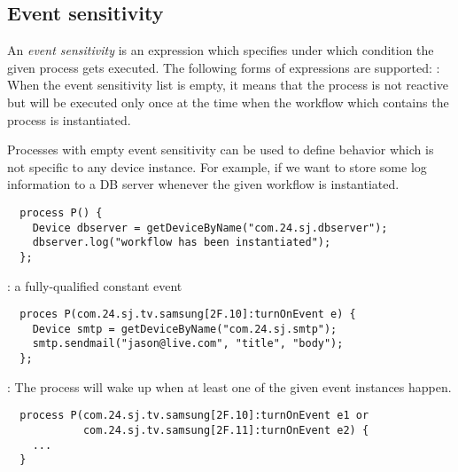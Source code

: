 \documentclass{note}
\begin{document}



\subsection{Event sensitivity} 
An {\em event sensitivity\/} is an expression which specifies under which
condition the given process gets executed. The following forms of expressions
are supported:
\bit
\w {}: When the event sensitivity list is empty, it means that
  the process is not reactive but will be executed only once at the time when
  the workflow which contains the process is instantiated. 

  Processes with empty event sensitivity can be used to define behavior which
  is not specific to any device instance. For example, if we want to store
  some log information to a DB server whenever the given workflow is
  instantiated. 
  \begin{verbatim}
  process P() {
    Device dbserver = getDeviceByName("com.24.sj.dbserver");
    dbserver.log("workflow has been instantiated");
  };
  \end{verbatim}

\w {}: a fully-qualified constant event
  \begin{verbatim}
  proces P(com.24.sj.tv.samsung[2F.10]:turnOnEvent e) {
    Device smtp = getDeviceByName("com.24.sj.smtp");
    smtp.sendmail("jason@live.com", "title", "body");
  };
  \end{verbatim}
\w {}: The process will wake up when at least one of
the given event instances happen.
  \begin{verbatim}
  process P(com.24.sj.tv.samsung[2F.10]:turnOnEvent e1 or
            com.24.sj.tv.samsung[2F.11]:turnOnEvent e2) {
    ...
  }
  \end{verbatim}
\end{document}
